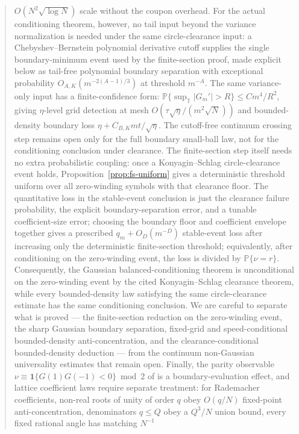 \documentclass[11pt]{amsart}
\numberwithin{equation}{section}
\theoremstyle{definition}
\theoremstyle{remark}
\newcommand{\T}{\mathbb T}
\newcommand{\Prob}{\mathbb P}
\begin{document}
\begin{abstract}
\(O(N^2\sqrt{\log N})\) scale without the coupon overhead. For the actual conditioning theorem, however, no tail input beyond
the variance normalization is needed under the same circle-clearance input: a
Chebyshev--Bernstein polynomial derivative cutoff supplies the single
boundary-minimum event used by the finite-section proof, made explicit below as
tail-free polynomial boundary separation with exceptional probability
\(O_{A,K}(m^{-2(A-1)/3})\) at threshold \(m^{-A}\).  The same variance-only
input has a finite-confidence form:
\(\Prob\{\sup_{\T}|G_m'|>R\}\le Cm^4/R^2\), giving \(\eta\)-level grid
detection at mesh \(O(\tau\sqrt\eta/(m^2\sqrt N))\) and bounded-density
boundary loss \(\eta+C_{B,K}mt/\sqrt\eta\). The cutoff-free
continuum crossing step remains open only for the full boundary small-ball law,
not for the conditioning conclusion under clearance. The finite-section step
itself needs no extra probabilistic coupling: once a Konyagin--Schlag
circle-clearance event holds, Proposition~\ref{prop:fs-uniform} gives a
deterministic threshold uniform over all zero-winding symbols with that
clearance floor. The quantitative loss in the stable-event conclusion is just
the clearance failure probability, the explicit boundary-separation error, and
a tunable coefficient-size error; choosing the boundary floor and coefficient
envelope together gives a prescribed \(q_m+O_D(m^{-D})\) stable-event loss after
increasing only the deterministic finite-section threshold; equivalently, after
conditioning on the zero-winding event, the loss is divided by
\(\Prob\{\nu=r\}\). Consequently, the Gaussian balanced-conditioning theorem is
unconditional on the zero-winding event by the cited Konyagin--Schlag clearance
theorem, while every
bounded-density law satisfying the same circle-clearance estimate has the same
conditioning conclusion. We are careful to separate what is proved --- the
finite-section reduction on the zero-winding event, the sharp Gaussian boundary
separation, fixed-grid and speed-conditional bounded-density anti-concentration,
and the clearance-conditional bounded-density deduction --- from the continuum
non-Gaussian universality estimates that remain open. Finally, the parity
observable \(\nu\equiv\mathbf1\{G(1)G(-1)<0\}\bmod2\) of \cite{Parity} is a
boundary-evaluation effect, and lattice coefficient laws require separate
treatment: for Rademacher coefficients, non-real roots of unity of order \(q\)
obey \(O(q/N)\) fixed-point anti-concentration, denominators \(q\le Q\) obey a
\(Q^3/N\) union bound, every fixed rational angle has matching \(N^{-1}\)

\end{abstract}
\end{document}
